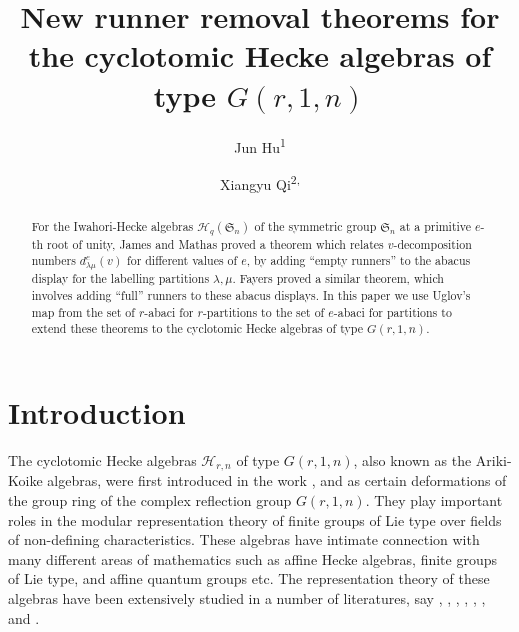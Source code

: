 \documentclass[a4paper,10pt]{amsart}
\title{New runner removal theorems for the cyclotomic Hecke algebras of type $G(r,1,n)$}
\author[]{Jun Hu\textsuperscript{1}}
\author[]{Xiangyu Qi\textsuperscript{2,\Letter}}
\theoremstyle{plain}
\renewcommand{\H}{\mathcal{H}}
\newcommand{\lam}{\lambda}
\def\Sym{\mathfrak{S}}
\theoremstyle{plain}
\numberwithin{equation}{section}
\begin{document}
\maketitle



{}
\vspace{5pt}
	
{}


\begin{abstract} For the Iwahori-Hecke algebras $\H_q(\Sym_n)$ of the symmetric group $\Sym_n$ at a primitive $e$-th root of unity, James and Mathas proved a theorem which relates $v$-decomposition numbers $d_{\lam\mu}^{e}(v)$ for different values of $e$, by adding ``empty runners'' to the abacus display  for the labelling partitions $\lam,\mu$. Fayers proved a similar theorem, which involves adding ``full'' runners to these abacus displays. In this paper we use Uglov's map from the set of $r$-abaci for $r$-partitions to the set of $e$-abaci for partitions to extend these theorems to the cyclotomic Hecke algebras of type $G(r,1,n)$.
\end{abstract}



\section{Introduction}
The cyclotomic Hecke algebras $\H_{r,n}$ of type $G(r,1,n)$, also known as the Ariki-Koike algebras, were first introduced in the work \cite[Definition 3.1]{AK}, \cite[Definition 4.1]{BM:cyc} and \cite[before Proposition 3.2]{C} as certain deformations of the group ring of the complex reflection group $G(r,1,n)$. They play important roles in the modular representation theory of finite groups of Lie type over fields of non-defining characteristics. These algebras have intimate connection with many different areas of mathematics such as affine Hecke algebras, finite groups of Lie type, and affine quantum groups etc. The representation theory of these algebras have been extensively studied in a number of literatures, say \cite{A1}, \cite{AK}, \cite{AM}, \cite{DJM}, \cite{DM}, \cite{HM}, \cite{LM} and \cite{Ma}.
\end{document}
